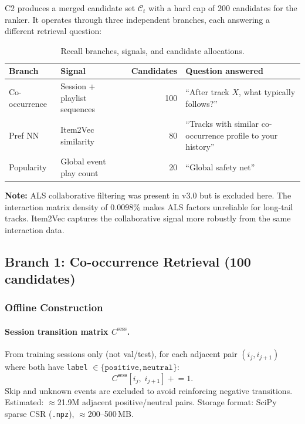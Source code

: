 \documentclass[11pt]{article}
\newcommand{\note}[1]{\textcolor{notegreen}{\textbf{Note:} #1}}
\begin{document}
C2 produces a merged candidate set $\mathcal{C}_t$ with a hard cap of
200 candidates for the ranker. It operates through three independent
branches, each answering a different retrieval question:

\begin{table}[H]
\centering
\caption{Recall branches, signals, and candidate allocations.}
\begin{tabular}{llrl}
\toprule
\textbf{Branch} & \textbf{Signal} & \textbf{Candidates} &
  \textbf{Question answered} \\
\midrule
Co-occurrence & Session + playlist sequences & 100 &
  ``After track $X$, what typically follows?'' \\
Pref NN & Item2Vec similarity & 80 &
  ``Tracks with similar co-occurrence profile to your history'' \\
Popularity & Global event play count & 20 &
  ``Global safety net'' \\
\bottomrule
\end{tabular}
\end{table}

\note{ALS collaborative filtering was present in v3.0 but is excluded
here. The interaction matrix density of $0.0098\%$ makes ALS factors
unreliable for long-tail tracks. Item2Vec captures the collaborative
signal more robustly from the same interaction data.}

\subsection{Branch 1: Co-occurrence Retrieval (100 candidates)}

\subsubsection{Offline Construction}

\paragraph{Session transition matrix $C^{\text{sess}}$.}
From training sessions only (not val/test), for each adjacent pair
$(i_j, i_{j+1})$ where both have
\texttt{label} $\in \{\texttt{positive}, \texttt{neutral}\}$:
\[
  C^{\text{sess}}[i_j,\; i_{j+1}] \mathrel{+}= 1.
\]
Skip and unknown events are excluded to avoid reinforcing negative transitions.
Estimated: $\approx$21.9M adjacent positive/neutral pairs.
Storage format: SciPy sparse CSR (\texttt{.npz}), $\approx$200--500\,MB.
\end{document}
